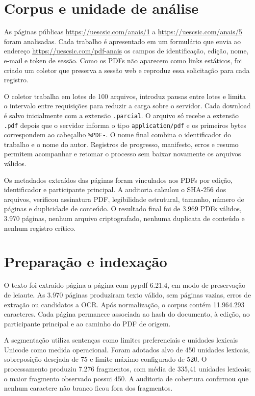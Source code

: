 \section{Corpus e unidade de análise}

As páginas públicas \url{https://uescsic.com/anais/1} a \url{https://uescsic.com/anais/5} foram analisadas. Cada trabalho é apresentado em um formulário que envia ao endereço \url{https://uescsic.com/pdf-anais} os campos de identificação, edição, nome, e-mail e token de sessão. Como os PDFs não aparecem como links estáticos, foi criado um coletor que preserva a sessão web e reproduz essa solicitação para cada registro.

O coletor trabalha em lotes de 100 arquivos, introduz pausas entre lotes e limita o intervalo entre requisições para reduzir a carga sobre o servidor. Cada download é salvo inicialmente com a extensão \texttt{.parcial}. O arquivo só recebe a extensão \texttt{.pdf} depois que o servidor informa o tipo \texttt{application/pdf} e os primeiros bytes correspondem ao cabeçalho \texttt{\%PDF-}. O nome final combina o identificador do trabalho e o nome do autor. Registros de progresso, manifesto, erros e resumo permitem acompanhar e retomar o processo sem baixar novamente os arquivos válidos.

Os metadados extraídos das páginas foram vinculados aos PDFs por edição, identificador e participante principal. A auditoria calculou o SHA-256 dos arquivos, verificou assinatura PDF, legibilidade estrutural, tamanho, número de páginas e duplicidade de conteúdo. O resultado final foi de 3.969 PDFs válidos, 3.970 páginas, nenhum arquivo criptografado, nenhuma duplicata de conteúdo e nenhum registro crítico.

\section{Preparação e indexação}

O texto foi extraído página a página com pypdf 6.21.4, em modo de preservação de leiaute. As 3.970 páginas produziram texto válido, sem páginas vazias, erros de extração ou candidatos a OCR. Após normalização, o corpus contém 11.964.293 caracteres. Cada página permanece associada ao hash do documento, à edição, ao participante principal e ao caminho do PDF de origem.

A segmentação utiliza sentenças como limites preferenciais e unidades lexicais Unicode como medida operacional. Foram adotados alvo de 450 unidades lexicais, sobreposição desejada de 75 e limite máximo configurado de 520. O processamento produziu 7.276 fragmentos, com média de 335,41 unidades lexicais; o maior fragmento observado possui 450. A auditoria de cobertura confirmou que nenhum caractere não branco ficou fora dos fragmentos.

